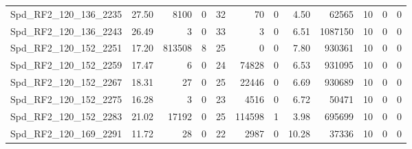 \begin{longtable}[c]{@{}lrrrrrrrrrrr@{}}
Spd\_RF2\_120\_136\_2235      & 27.50                  & 8100                    & 0                       & 32                     & 70                      & 0                       & 4.50                    & 62565                    & 10                       & 0                        & 0                        \\
Spd\_RF2\_120\_136\_2243      & 26.49                  & 3                       & 0                       & 33                     & 3                       & 0                       & 6.51                    & 1087150                  & 10                       & 0                        & 0                        \\
Spd\_RF2\_120\_152\_2251      & 17.20                  & 813508                  & 8                       & 25                     & 0                       & 0                       & 7.80                    & 930361                   & 10                       & 0                        & 0                        \\
Spd\_RF2\_120\_152\_2259      & 17.47                  & 6                       & 0                       & 24                     & 74828                   & 0                       & 6.53                    & 931095                   & 10                       & 0                        & 0                        \\
Spd\_RF2\_120\_152\_2267      & 18.31                  & 27                      & 0                       & 25                     & 22446                   & 0                       & 6.69                    & 930689                   & 10                       & 0                        & 0                        \\
Spd\_RF2\_120\_152\_2275      & 16.28                  & 3                       & 0                       & 23                     & 4516                    & 0                       & 6.72                    & 50471                    & 10                       & 0                        & 0                        \\
Spd\_RF2\_120\_152\_2283      & 21.02                  & 17192                   & 0                       & 25                     & 114598                  & 1                       & 3.98                    & 695699                   & 10                       & 0                        & 0                        \\
Spd\_RF2\_120\_169\_2291      & 11.72                  & 28                      & 0                       & 22                     & 2987                    & 0                       & 10.28                   & 37336                    & 10                       & 0                        & 0                        \\

\end{longtable}
